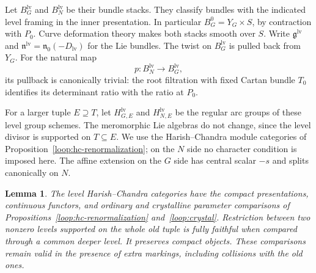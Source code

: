 \documentclass[11pt]{article}
\numberwithin{equation}{section}
\newtheorem{lemma}[theorem]{Lemma}
\theoremstyle{definition}
\theoremstyle{remark}
\begin{document}
Let $B_G^{\mathrm{lv}}$ and $B_N^{\mathrm{lv}}$ be their bundle stacks.
They classify bundles with the indicated level framing in the inner
presentation.  In particular $B_G^0=Y_G\times S$, by contraction with
$P_0$.  Curve deformation theory makes both stacks smooth over $S$.
Write $\mathfrak g^{\mathrm{lv}}$ and
$\mathfrak n^{\mathrm{lv}}=\mathfrak n_0(-D_{\mathrm{lv}})$ for the Lie
bundles.  The twist on $B_G^{\mathrm{lv}}$ is pulled back from $Y_G$.
For the natural map
\[
 p:B_N^{\mathrm{lv}}\longrightarrow B_G^{\mathrm{lv}},
\]
its pullback is canonically trivial: the root filtration with fixed
Cartan bundle $T_0$ identifies its determinant ratio with the ratio at
$P_0$.

For a larger tuple $E\supseteq T$, let
$H_{G,E}^{\mathrm{lv}}$ and $H_{N,E}^{\mathrm{lv}}$ be the regular arc
groups of these level group schemes.  The meromorphic Lie algebras do
not change, since the level divisor is supported on $T\subseteq E$.
We use the Harish--Chandra module categories of
Proposition~\ref{loop:hc-renormalization}; on the $N$ side no character condition is imposed here.
The affine extension on the $G$ side has central scalar $-s$ and splits
canonically on $N$.

\begin{lemma}\label{loc:levels}
The level Harish--Chandra categories have the compact presentations,
continuous functors, and ordinary and crystalline parameter comparisons
of Propositions~\ref{loop:hc-renormalization} and~\ref{loop:crystal}.  Restriction between two nonzero levels supported on
the whole old tuple is fully faithful when compared through a common
deeper level.  It preserves compact objects.  These comparisons remain
valid in the presence of extra markings, including collisions with the
old ones.
\end{lemma}
\end{document}
